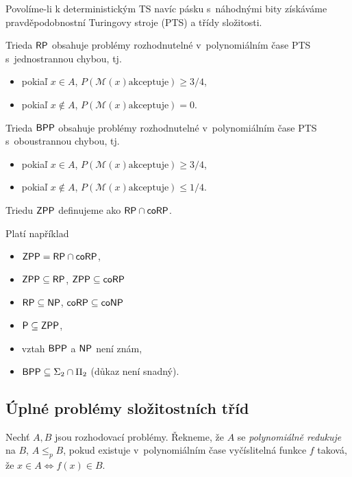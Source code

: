 Povolíme-li k deterministickým TS navíc pásku s~náhodnými bity získáváme pravděpodobnostní
Turingovy stroje (PTS) a třídy složitosti.

\begin{definition}
	Trieda ${\mathsf{RP}}$ obsahuje problémy rozhodnutelné v~polynomiálním čase 
	PTS s~jednostrannou chybou, tj.
	\begin{itemize}
		\item pokiaľ $x \in A$, $P(\mathcal{M}(x) \text{akceptuje}) \geq 3/4$,
		\item pokiaľ $x \not\in A$, $P(\mathcal{M}(x) \text{akceptuje}) = 0$.
	\end{itemize}
\end{definition}

\begin{definition}
	Trieda ${\mathsf{BPP}}$ obsahuje problémy rozhodnutelné v~polynomiálním čase 
	PTS s~oboustrannou chybou, tj.
	\begin{itemize}
		\item pokiaľ $x \in A$, $P(\mathcal{M}(x) \text{akceptuje}) \geq 3/4$,
		\item pokiaľ $x \not\in A$, $P(\mathcal{M}(x) \text{akceptuje}) \leq 1/4$.
	\end{itemize}
\end{definition}

\begin{definition}
	Triedu ${\mathsf{ZPP}}$ definujeme ako ${\mathsf{RP}} \cap {\ensuremath{\mathsf{coRP}}}$.
\end{definition}

Platí například
\begin{itemize}
    \item ${\mathsf{ZPP}} = {\mathsf{RP}} \cap {\ensuremath{\mathsf{coRP}}}$,
	\item ${\mathsf{ZPP}} \subseteq {\ensuremath{\mathsf{RP}}}$, ${\mathsf{ZPP}} \subseteq {\ensuremath{\mathsf{coRP}}}$
	\item ${\mathsf{RP}} \subseteq {\ensuremath{\mathsf{NP}}}$, ${\mathsf{coRP}} \subseteq {\ensuremath{\mathsf{coNP}}}$
    \item ${\mathsf{P}} \subseteq {\ensuremath{\mathsf{ZPP}}}$,
    \item vztah ${\mathsf{BPP}}$ a ${\mathsf{NP}}$ není znám,
    \item ${\mathsf{BPP}} \subseteq \Sigma_2 \cap \Pi_2$ (důkaz není snadný).
\end{itemize}

\subsection{Úplné problémy složitostních tříd}

\begin{definition}
    Nechť $A, B$ jsou rozhodovací problémy.
    Řekneme, že $A$ se {\em polynomiálně redukuje} na $B$,
    $A \leq_p B$, pokud existuje v~polynomiálním čase vyčíslitelná
    funkce $f$ taková, že $x \in A \iff f(x) \in B$.
\end{definition}

